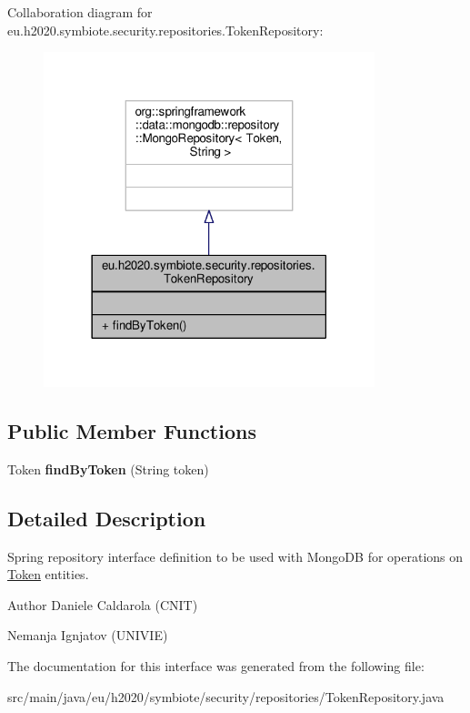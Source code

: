 Collaboration diagram for eu.\+h2020.\+symbiote.\+security.\+repositories.\+Token\+Repository\+:
\nopagebreak
\begin{figure}[H]
\begin{center}
\leavevmode
\includegraphics[width=273pt]{interfaceeu_1_1h2020_1_1symbiote_1_1security_1_1repositories_1_1TokenRepository__coll__graph}
\end{center}
\end{figure}
\subsection*{Public Member Functions}
\begin{DoxyCompactItemize}
\item 
Token {\bfseries find\+By\+Token} (String token)\hypertarget{interfaceeu_1_1h2020_1_1symbiote_1_1security_1_1repositories_1_1TokenRepository_a7731062720d5830ffa17bc0d6c3bc70a}{}\label{interfaceeu_1_1h2020_1_1symbiote_1_1security_1_1repositories_1_1TokenRepository_a7731062720d5830ffa17bc0d6c3bc70a}

\end{DoxyCompactItemize}


\subsection{Detailed Description}
Spring repository interface definition to be used with Mongo\+DB for operations on \hyperlink{}{Token} entities.

\begin{DoxyAuthor}{Author}
Daniele Caldarola (C\+N\+IT) 

Nemanja Ignjatov (U\+N\+I\+V\+IE) 
\end{DoxyAuthor}


The documentation for this interface was generated from the following file\+:\begin{DoxyCompactItemize}
\item 
src/main/java/eu/h2020/symbiote/security/repositories/Token\+Repository.\+java\end{DoxyCompactItemize}
